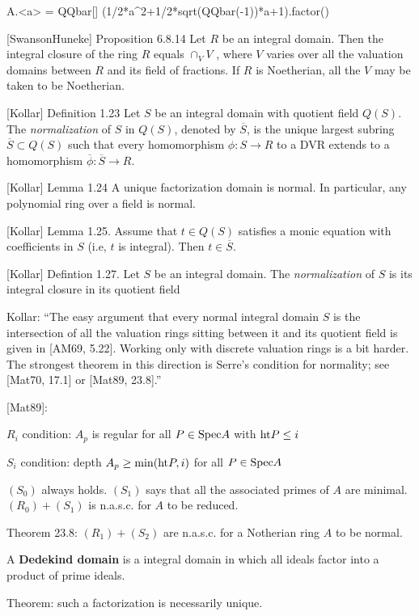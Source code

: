 \begin{sageblock}[lemniscate]
A.<a> = QQbar[]
(1/2*a^2+1/2*sqrt(QQbar(-1))*a+1).factor()
\end{sageblock}


[SwansonHuneke] Proposition 6.8.14 Let $R$ be an integral domain. Then
the integral closure of the ring $R$ equals $\cap_V V$ , where $V$
varies over all the valuation domains between $R$ and its field of
fractions. If $R$ is Noetherian, all the $V$ may be taken to be
Noetherian.

[Kollar] Definition 1.23
Let $S$ be an integral domain with quotient field $Q(S)$.
The {\it normalization} of $S$ in $Q(S)$, denoted by $\overline{S}$,
is the unique largest subring $\overline{S} \subset Q(S)$
such that every homomorphism $\phi: S \to R$ to a DVR
extends to a homomorphism $\overline{\phi}: \overline{S} \to R$.

[Kollar] Lemma 1.24
A unique factorization domain is normal.  In particular,
any polynomial ring over a field is normal.

[Kollar] Lemma 1.25.
Assume that $t \in Q(S)$ satisfies a monic equation
with coefficients in $S$ (i.e, $t$ is integral).
Then $t \in \overline{S}$.

[Kollar] Defintion 1.27.
Let $S$ be an integral domain.  The {\it normalization} of $S$
is its integral closure in its quotient field

Kollar: ``The easy argument that every normal integral domain $S$
is the intersection of all the valuation rings sitting between
it and its quotient field is given in [AM69, 5.22].  Working
only with discrete valuation rings is a bit harder.  The strongest
theorem in this direction is Serre's condition for normality;
see [Mat70, 17.1] or [Mat89, 23.8].''

[Mat89]:

$R_i$ condition: $A_p$ is regular for all $P \in {\rm Spec } A$ with ${\rm ht } P \le i$

$S_i$ condition: depth $A_p \ge {\rm min}({\rm ht } P, i)$ for all $P \in {\rm Spec } A$

$(S_0)$ always holds. $(S_1)$ says that all the associated primes of $A$ are minimal.
$(R_0)+(S_1)$ is n.a.s.c. for $A$ to be reduced.

Theorem 23.8: $(R_1)+(S_2)$ are n.a.s.c. for a Notherian ring $A$ to be normal.

A {\bf Dedekind domain} is a integral domain in which all ideals factor into a product of prime ideals.

Theorem: such a factorization is necessarily unique.

